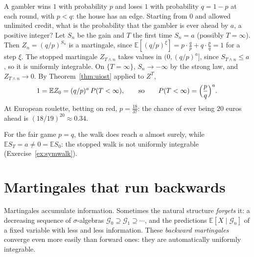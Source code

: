 \begin{example}\label{ex:biasedruin}
A gambler wins $1$ with probability $p$ and loses $1$ with probability $q=1-p$ at each round, with $p<q$: the house has an edge. Starting from $0$ and allowed unlimited credit, what is the
probability that the gambler is ever ahead by $a$, a positive integer? Let $S_n$ be the gain and $T$ the first time $S_n=a$ (possibly $T=\infty$). Then $Z_n=(q/p)^{S_n}$ is a martingale,
since $\mathbb E[(q/p)^{\xi}]=p\cdot\frac qp+q\cdot\frac pq=1$ for a step $\xi$. The stopped martingale $Z_{T\wedge n}$ takes values in $(0,(q/p)^a]$, since $S_{T\wedge n}\le a$, so it is
uniformly integrable. On $\{T=\infty\}$, $S_n\to-\infty$ by the strong law, and $Z_{T\wedge n}\to0$. By Theorem~\ref{thm:uiost} applied to $Z^T$,
\[
1=\mathbb EZ_0=(q/p)^a\,P(T<\infty),\qquad\text{so}\qquad P(T<\infty)=\Bigl(\frac pq\Bigr)^a.
\]
At European roulette, betting on red, $p=\frac{18}{37}$: the chance of ever being $20$ euros ahead is $(18/19)^{20}\approx0.34$.
\end{example}

For the fair game $p=q$, the walk does reach $a$ almost surely, while $\mathbb ES_T=a\neq0=\mathbb ES_0$: the stopped walk is not uniformly integrable (Exercise~\ref{ex:symwalk}).

\section{Martingales that run backwards}

Martingales accumulate information. Sometimes the natural structure \emph{forgets} it: a decreasing sequence of $\sigma$-algebras $\mathcal G_0\supseteq\mathcal G_1\supseteq\cdots$, and
the predictions $\mathbb E[X\mid\mathcal G_n]$ of a fixed variable with less and less information. These \emph{backward martingales} converge even more easily than forward ones: they are
automatically uniformly integrable.

